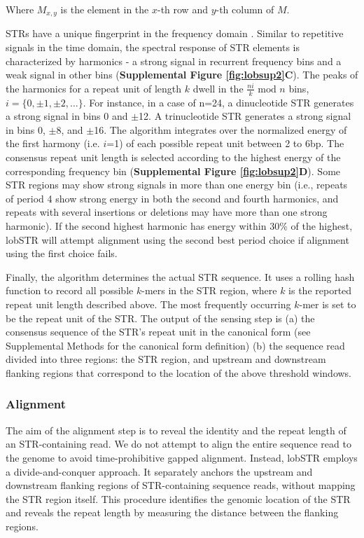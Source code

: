 {Where $M_{x,y}$ is the element in the $x$-th row and $y$-th column of $M$.

STRs have a unique fingerprint in the frequency domain \cite{SharmaIssacRaghavaEtAl2004,ZhouDuYan2009}. Similar to repetitive signals in the time domain, the spectral response of STR elements is characterized by harmonics - a strong signal in recurrent frequency bins and a weak signal in other bins (\textbf{Supplemental Figure \ref{fig:lobsup2}C}). The peaks of the harmonics for a repeat unit of length $k$ dwell in the $\frac{ni}{k} \text{ mod } n$ bins, $i = \{ 0, \pm 1, \pm 2, \hdots \}$. For instance, in a case of n=24, a dinucleotide STR generates a strong signal in bins 0 and $\pm$12. A trinucleotide STR generates a strong signal in bins 0, $\pm$8, and $\pm$16. The algorithm integrates over the normalized energy of the first harmony (i.e. $i$=1) of each possible repeat unit between 2 to 6bp. The consensus repeat unit length is selected according to the highest energy of the corresponding frequency bin (\textbf{Supplemental Figure \ref{fig:lobsup2}D}). Some STR regions may show strong signals in more than one energy bin (i.e., repeats of period 4 show strong energy in both the second and fourth harmonics, and repeats with several insertions or deletions may have more than one strong harmonic). If the second highest harmonic has energy within 30\% of the highest, lobSTR will attempt alignment using the second best period choice if alignment using the first choice fails.

Finally, the algorithm determines the actual STR sequence. It uses a rolling hash function to record all possible $k$-mers in the STR region, where $k$ is the reported repeat unit length described above. The most frequently occurring $k$-mer is set to be the repeat unit of the STR. The output of the sensing step is (a) the consensus sequence of the STR's repeat unit in the canonical form (see Supplemental Methods for the canonical form definition) (b) the sequence read divided into three regions: the STR region, and upstream and downstream flanking regions that correspond to the location of the above threshold windows. 

\subsubsection{Alignment}
The aim of the alignment step is to reveal the identity and the repeat length of an STR-containing read. We do not attempt to align the entire sequence read to the genome to avoid time-prohibitive gapped alignment. Instead, lobSTR employs a divide-and-conquer approach. It separately anchors the upstream and downstream flanking regions of STR-containing sequence reads, without mapping the STR region itself. This procedure identifies the genomic location of the STR and reveals the repeat length by measuring the distance between the flanking regions.

}
